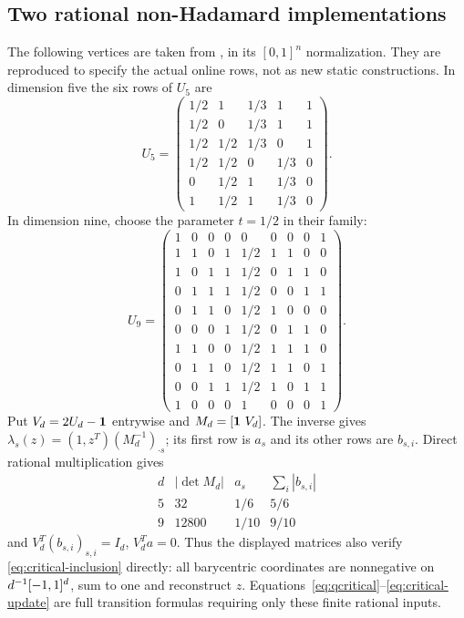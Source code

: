 \subsection{Two rational non-Hadamard implementations}
The following vertices are taken from \cite[Theorem 4 and Section 9]{NU},
in its $[0,1]^n$ normalization. They are reproduced to specify the actual
online rows, not as new static constructions. In dimension five the
six rows of $U_5$ are
\begin{equation}\label{eq:U5}
 U_5=\begin{pmatrix}
 1/2&1&1/3&1&1\\
 1/2&0&1/3&1&1\\
 1/2&1/2&1/3&0&1\\
 1/2&1/2&0&1/3&0\\
 0&1/2&1&1/3&0\\
 1&1/2&1&1/3&0
 \end{pmatrix}.
\end{equation}
In dimension nine, choose the parameter $t=1/2$ in their family:
\begin{equation}\label{eq:U9}
 U_9=\begin{pmatrix}
 1&0&0&0&0&0&0&0&1\\
 1&1&0&1&1/2&1&1&0&0\\
 1&0&1&1&1/2&0&1&1&0\\
 0&1&1&1&1/2&0&0&1&1\\
 0&1&1&0&1/2&1&0&0&0\\
 0&0&0&1&1/2&0&1&1&0\\
 1&1&0&0&1/2&1&1&1&0\\
 0&1&1&0&1/2&1&1&0&1\\
 0&0&1&1&1/2&1&0&1&1\\
 1&0&0&0&1&0&0&0&1
 \end{pmatrix}.
\end{equation}
Put $V_d=2U_d-\mathbf1$ entrywise and $M_d=[\mathbf1\ V_d]$. The inverse gives
$\lambda_s(z)=(1,z^T)(M_d^{-1})_{\cdot s}$; its first row is $a_s$
and its other rows are $b_{s,i}$. Direct rational multiplication gives
\begin{equation}\label{eq:seed-certificates}
 \begin{array}{c|ccc}
 d&|\det M_d|&a_s&\sum_i|b_{s,i}|\\\hline
 5&32&1/6&5/6\\
 9&12800&1/10&9/10
 \end{array}
\end{equation}
and $V_d^T(b_{s,i})_{s,i}=I_d$, $V_d^Ta=0$. Thus the displayed matrices
also verify \eqref{eq:critical-inclusion} directly: all barycentric
coordinates are nonnegative on $d^{-1}[-1,1]^d$, sum to one and
reconstruct $z$. Equations~\eqref{eq:qcritical}--\eqref{eq:critical-update}
are full transition formulas requiring only these finite rational inputs.

